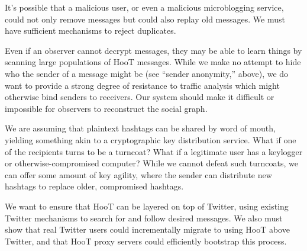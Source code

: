 \begin{description}
\begin{description}
\item[Replay attacks.] It's possible that a malicious user, or even a malicious microblogging service, could not only remove messages but could also replay old messages. We must have sufficient mechanisms to reject duplicates.

\item[Statistical and traffic analysis.] Even if an observer cannot decrypt messages, they may be able to learn things by scanning large populations of HooT messages. While we make no attempt to hide who the sender of a message might be (see ``sender anonymity,'' above), we do want to provide a strong degree of resistance to traffic analysis which might otherwise bind senders to receivers. Our system should make it difficult or impossible for observers to reconstruct the social graph.

\item[Secret informers and coerced users.] We are assuming that plaintext hashtags can be shared by word of mouth, yielding something akin to a cryptographic key distribution service. What if one of the recipients turns to be a turncoat? What if a legitimate user has a keylogger or otherwise-compromised computer? While we cannot defeat such turncoats, we can offer some amount of key agility, where the sender can distribute new hashtags to replace older, compromised hashtags.

\item[Compatibility.] We want to ensure that HooT can be layered on top of Twitter, using existing Twitter mechanisms to search for and follow desired messages. We also must show that real Twitter users could incrementally migrate to using HooT above Twitter, and that HooT proxy servers could efficiently bootstrap this process.

\item 


\end{description}
\end{description}
